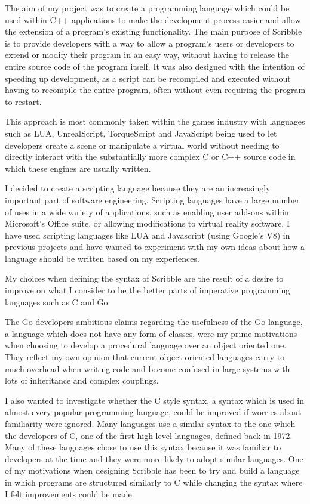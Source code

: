 \documentclass[]{final_report}
\begin{document}
The aim of my project was to create a programming language which could be used within C++ applications to make the development process easier and allow the extension of a program's existing functionality. The main purpose of Scribble is to provide developers with a way to allow a program's users or developers to extend or modify their program in an easy way, without having to release the entire source code of the program itself. It was also designed with the intention of speeding up development, as a script can be recompiled and executed without having to recompile the entire program, often without even requiring the program to restart.

This approach is most commonly taken within the games industry with languages such as LUA, UnrealScript, TorqueScript and JavaScript being used to let developers create a scene or manipulate a virtual world without needing to directly interact with the substantially more complex C or C++ source code in which these engines are usually written.

I decided to create a scripting language because they are an increasingly important part of software engineering. Scripting languages have a large number of uses in a wide variety of applications, such as enabling user add-ons within Microsoft's Office suite, or allowing modifications to virtual reality software. I have used scripting languages like LUA and Javascript (using Google's V8) in previous projects and have wanted to experiment with my own ideas about how a language should be written based on my experiences. 

My choices when defining the syntax of Scribble are the result of a desire to improve on what I consider to be the better parts of imperative programming languages such as C and Go.

The Go developers ambitious claims regarding the usefulness of the Go language, a language which does not have any form of classes, were my prime motivations when choosing to develop a procedural language over an object oriented one. They reflect my own opinion that current object oriented languages carry to much overhead when writing code and become confused in large systems with lots of inheritance and complex couplings.

I also wanted to investigate whether the C style syntax, a syntax which is used in almost every popular programming language, could be improved if worries about familiarity were ignored. Many languages use a similar syntax to the one which the developers of C, one of the first high level languages, defined back in 1972. Many of these languages chose to use this syntax because it was familiar to developers at the time and they were more likely to adopt similar languages. One of my motivations when designing Scribble has been to try and build a language in which programs are structured similarly to C while changing the syntax where I felt improvements could be made.
\end{document}
